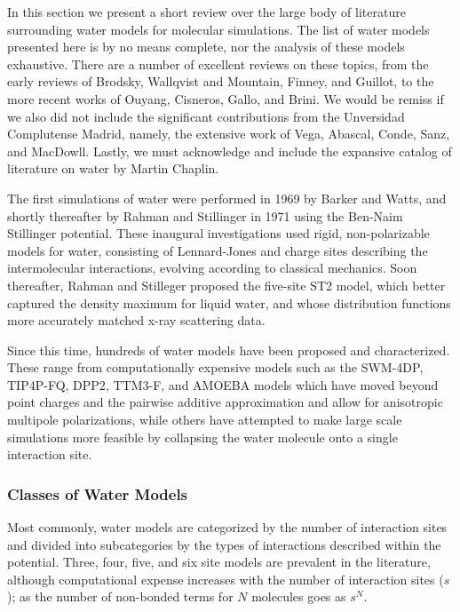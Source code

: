 In this section we present a short review over the large body of
literature surrounding water models for molecular simulations. The
list of water models presented here is by no means complete, nor the
analysis of these models exhaustive. There are a number of excellent
reviews on these topics, from the early reviews of
Brodsky\cite{Brodsky1996}, Wallqvist and Mountain\cite{Wallqvist1999},
Finney\cite{Finney2001}, and Guillot\cite{Guillot2002}, to the more
recent works of Ouyang\cite{Ouyang2015}, Cisneros\cite{Cisneros2016},
Gallo\cite{Gallo2016}, and Brini\cite{Brini2017}. We would be remiss
if we also did not include the significant contributions from the
Unversidad Complutense Madrid, namely, the extensive work of Vega,
Abascal, Conde, Sanz, and
MacDowll.\cite{MacDowell2004,Vega2005,Vega2005c,Abascal2007,Abascal2007a,Abascal2007b,Abascal2007c,Vega2009,Vega2011,Vega2011a,Vega2015}
Lastly, we must acknowledge and include the expansive catalog of
literature on water by Martin Chaplin.\cite{Chaplin2018}

The first simulations of water were performed in 1969 by Barker and
Watts,\cite{Barker1969} and shortly thereafter by Rahman and
Stillinger in 1971\cite{Rahman1971} using the Ben-Naim Stillinger
potential\cite{Ben-Naim1972}. These inaugural investigations used
rigid, non-polarizable models for water, consisting of Lennard-Jones
and charge sites describing the intermolecular interactions, evolving
according to classical mechanics. Soon thereafter, Rahman and
Stilleger proposed the five-site ST2 model, which better captured the
density maximum for liquid water, and whose distribution functions
more accurately matched x-ray scattering data.\cite{Stillinger1974}

Since this time, hundreds of water models have been proposed and
characterized.\cite{Chaplin2018} These range from computationally
expensive models such as the SWM-4DP\cite{Lamourex2003},
TIP4P-FQ\cite{Rick1994}, DPP2\cite{Kumar2010},
TTM3-F\cite{Fanourgakis2008}, and AMOEBA\cite{Ren2003,Ren2004} models
which have moved beyond point charges and the pairwise additive
approximation and allow for anisotropic multipole polarizations, while
others have attempted to make large scale simulations more feasible by
collapsing the water molecule onto a single interaction
site\cite{Liu1996,Tan2003,Fennell2004}.

\subsubsection{Classes of Water Models}
Most commonly, water models are categorized by the number of
interaction sites and divided into subcategories by the types of
interactions described within the potential. Three, four, five, and
six site models are prevalent in the literature, although
computational expense increases with the number of interaction sites
($s$); as the number of non-bonded terms for $N$ molecules goes as
$s^N$. 

